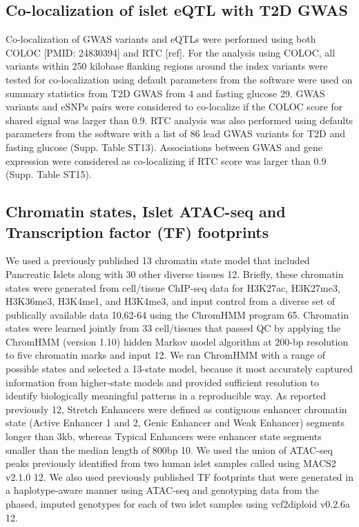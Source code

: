\subsection{Co-localization of islet eQTL with T2D GWAS}
Co-localization of GWAS variants and eQTLs were performed using both COLOC [PMID: 24830394] and RTC [ref]. For the analysis using COLOC, all variants within 250 kilobase flanking regions around the index variants were tested for co-localization using default parameters from the software were used on summary statistics from T2D GWAS from 4 and fasting glucose 29. GWAS variants and eSNPs pairs were considered to co-localize if the COLOC score for shared signal was larger than 0.9. RTC analysis was also performed using defaults parameters from the software with a list of 86 lead GWAS variants for T2D and fasting glucose (Supp. Table ST13). Associations between GWAS and gene expression were considered as co-localizing if RTC score was larger than 0.9 (Supp. Table ST15). 

\subsection{Chromatin states, Islet ATAC-seq and Transcription factor (TF) footprints}
We used a previously published 13 chromatin state model that included Pancreatic Islets along with 30 other diverse tissues 12. Briefly, these chromatin states were generated from cell/tissue ChIP-seq data for H3K27ac, H3K27me3, H3K36me3, H3K4me1, and H3K4me3, and input control from a diverse set of publically available data 10,62-64 using the ChromHMM program 65. Chromatin states were learned jointly from 33 cell/tissues that passed QC by applying the ChromHMM (version 1.10) hidden Markov model algorithm at 200-bp resolution to five chromatin marks and input 12. We ran ChromHMM with a range of possible states and selected a 13-state model, because it most accurately captured information from higher-state models and provided sufficient resolution to identify biologically meaningful patterns in a reproducible way. As reported previously 12, Stretch Enhancers were defined as contiguous enhancer chromatin state (Active Enhancer 1 and 2, Genic Enhancer and Weak Enhancer) segments longer than 3kb, whereas Typical Enhancers were enhancer state segments smaller than the median length of 800bp 10.
We used the union of ATAC-seq peaks previously identified from two human islet samples called using MACS2 v2.1.0 12. We also used previously published TF footprints that were generated in a haplotype-aware manner using ATAC-seq and genotyping data from the phased, imputed genotypes for each of two islet samples using vcf2diploid v0.2.6a 12.
